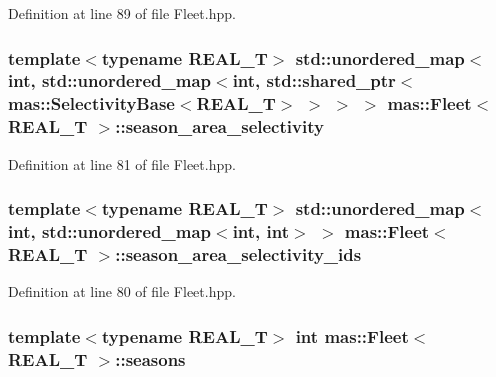 Definition at line 89 of file Fleet.\-hpp.

\hypertarget{structmas_1_1_fleet_aa8e734855b66757bf86314f6ae76878c}{
\subsubsection[{season\-\_\-area\-\_\-selectivity}]{\setlength{\rightskip}{0pt plus 5cm}template$<$typename R\-E\-A\-L\-\_\-\-T$>$ std\-::unordered\-\_\-map$<$int, std\-::unordered\-\_\-map$<$int, std\-::shared\-\_\-ptr$<${\bf mas\-::\-Selectivity\-Base}$<$R\-E\-A\-L\-\_\-\-T$>$ $>$ $>$ $>$ {\bf mas\-::\-Fleet}$<$ R\-E\-A\-L\-\_\-\-T $>$\-::season\-\_\-area\-\_\-selectivity}}\label{structmas_1_1_fleet_aa8e734855b66757bf86314f6ae76878c}


Definition at line 81 of file Fleet.\-hpp.

\hypertarget{structmas_1_1_fleet_a2c2c1b323ec7845085ebe105b5f64096}{
\subsubsection[{season\-\_\-area\-\_\-selectivity\-\_\-ids}]{\setlength{\rightskip}{0pt plus 5cm}template$<$typename R\-E\-A\-L\-\_\-\-T$>$ std\-::unordered\-\_\-map$<$int, std\-::unordered\-\_\-map$<$int, int$>$ $>$ {\bf mas\-::\-Fleet}$<$ R\-E\-A\-L\-\_\-\-T $>$\-::season\-\_\-area\-\_\-selectivity\-\_\-ids}}\label{structmas_1_1_fleet_a2c2c1b323ec7845085ebe105b5f64096}


Definition at line 80 of file Fleet.\-hpp.

\hypertarget{structmas_1_1_fleet_a389f70f4bb3190303aba1ae9aca8c018}{
\subsubsection[{seasons}]{\setlength{\rightskip}{0pt plus 5cm}template$<$typename R\-E\-A\-L\-\_\-\-T$>$ int {\bf mas\-::\-Fleet}$<$ R\-E\-A\-L\-\_\-\-T $>$\-::seasons}}\label{structmas_1_1_fleet_a389f70f4bb3190303aba1ae9aca8c018}


